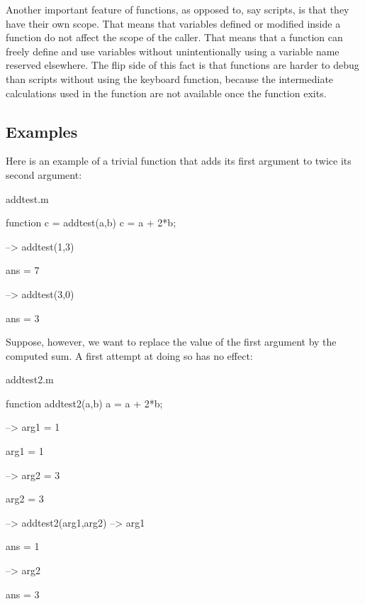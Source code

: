 Another important feature of functions, as opposed to, say {\ttfamily scripts}, is that they have their own {\ttfamily scope}. That means that variables defined or modified inside a function do not affect the scope of the caller. That means that a function can freely define and use variables without unintentionally using a variable name reserved elsewhere. The flip side of this fact is that functions are harder to debug than scripts without using the {\ttfamily keyboard} function, because the intermediate calculations used in the function are not available once the function exits. \hypertarget{variables_matrix_Examples}{}\subsection{Examples}\label{variables_matrix_Examples}
Here is an example of a trivial function that adds its first argument to twice its second argument\-:

\begin{DoxyVerb}     addtest.m
\end{DoxyVerb}



\begin{DoxyVerbInclude}
function c = addtest(a,b)
  c = a + 2*b;
\end{DoxyVerbInclude}



\begin{DoxyVerbInclude}
--> addtest(1,3)

ans = 
 7 

--> addtest(3,0)

ans = 
 3 
\end{DoxyVerbInclude}


Suppose, however, we want to replace the value of the first argument by the computed sum. A first attempt at doing so has no effect\-:

\begin{DoxyVerb}     addtest2.m
\end{DoxyVerb}



\begin{DoxyVerbInclude}
function addtest2(a,b)
  a = a + 2*b;
\end{DoxyVerbInclude}



\begin{DoxyVerbInclude}
--> arg1 = 1

arg1 = 
 1 

--> arg2 = 3

arg2 = 
 3 

--> addtest2(arg1,arg2)
--> arg1

ans = 
 1 

--> arg2

ans = 
 3 
\end{DoxyVerbInclude}


